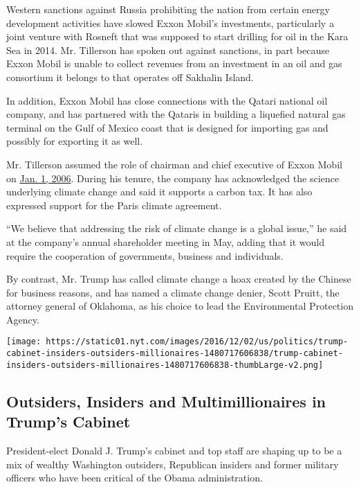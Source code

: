 Western sanctions against Russia prohibiting the nation from certain
energy development activities have slowed Exxon Mobil's investments,
particularly a joint venture with Rosneft that was supposed to start
drilling for oil in the Kara Sea in 2014. Mr. Tillerson has spoken out
against sanctions, in part because Exxon Mobil is unable to collect
revenues from an investment in an oil and gas consortium it belongs to
that operates off Sakhalin Island.

In addition, Exxon Mobil has close connections with the Qatari national
oil company, and has partnered with the Qataris in building a liquefied
natural gas terminal on the Gulf of Mexico coast that is designed for
importing gas and possibly for exporting it as well.

Mr. Tillerson assumed the role of chairman and chief executive of Exxon
Mobil on
\href{http://corporate.exxonmobil.com/en/company/about-us/management/rex-w-tillerson}{Jan.
1, 2006}. During his tenure, the company has acknowledged the science
underlying climate change and said it supports a carbon tax. It has also
expressed support for the Paris climate agreement.

``We believe that addressing the risk of climate change is a global
issue,'' he said at the company's annual shareholder meeting in May,
adding that it would require the cooperation of governments, business
and individuals.

By contrast, Mr. Trump has called climate change a hoax created by the
Chinese for business reasons, and has named a climate change denier,
Scott Pruitt, the attorney general of Oklahoma, as his choice to lead
the Environmental Protection Agency.

\href{https://www.nytimes.com/interactive/2016/12/05/us/politics/trump-cabinet-insiders-outsiders-millionaires.html}{}

\texttt{[image: https://static01.nyt.com/images/2016/12/02/us/politics/trump-cabinet-insiders-outsiders-millionaires-1480717606838/trump-cabinet-insiders-outsiders-millionaires-1480717606838-thumbLarge-v2.png]}

\hypertarget{outsiders-insiders-and-multimillionaires-in-trumps-cabinet}{%
\subsection{Outsiders, Insiders and Multimillionaires in Trump's
Cabinet}\label{outsiders-insiders-and-multimillionaires-in-trumps-cabinet}}

President-elect Donald J. Trump's cabinet and top staff are shaping up
to be a mix of wealthy Washington outsiders, Republican insiders and
former military officers who have been critical of the Obama
administration.

